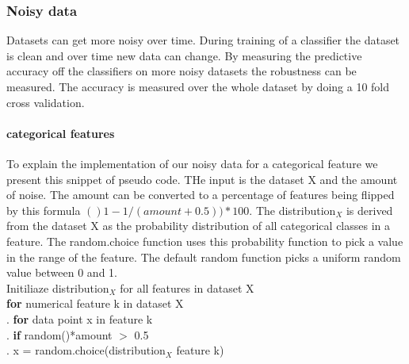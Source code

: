 \documentclass[a4paper,10pt]{article}
\begin{document}
\subsubsection{Noisy data}
Datasets can get more noisy over time. During training of a classifier the dataset is clean and over time new data can change. By measuring the predictive accuracy off the classifiers on more noisy datasets the robustness can be measured. The accuracy is measured over the whole dataset by doing a 10 fold cross validation.

\paragraph{categorical features \newline}
To explain the implementation of our noisy data for a categorical feature we present this snippet of pseudo code. THe input is the dataset X and the amount of noise. The amount can be converted to a percentage of features being flipped by this formula $()1-1/(amount+0.5))*100$. The distribution$_X$ is derived from the dataset X as the probability distribution of all categorical classes in a feature. The random.choice function uses this probability function to pick a value in the range of the feature. The default random function picks a uniform random value between 0 and 1.  \\
Initiliaze distribution$_X$ for all features in dataset X\\
\textbf{for} numerical feature k in dataset X\\
.\hspace{1cm} \textbf{for} data point x in feature k\\
.\hspace{2cm} \textbf{if} random()*amount $>$ 0.5 \\	
.\hspace{3cm} x = random.choice(distribution$_X$ feature k) 
\\
\end{document}

